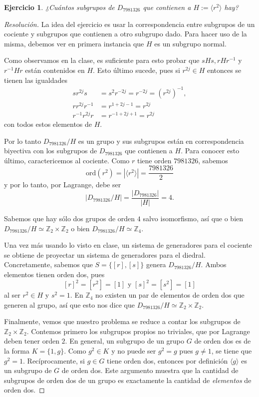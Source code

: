 \documentclass[11pt]{article}
\theoremstyle{colored}
\newtheorem{exercise}{Ejercicio}
\newcommand{\Z}{\mathbb{Z}}
\begin{document}
\begin{exercise} ¿Cuántos subgrupos de $D_{7981326}$ que contienen a $H := \langle r^2 \rangle$ hay?
\end{exercise}
\begin{proof}[Resolución] La idea del ejercicio es usar la correspondencia entre subgrupos de un cociente y subgrupos que contienen a otro subgrupo dado. Para hacer uso de la misma, debemos ver en primera instancia que $H$ es un subgrupo normal.

Como observamos en la clase, es suficiente para esto probar que $sHs,rHr^{-1}$ y $r^{-1}Hr$ están contenidos en $H$. Esto último sucede, pues si $r^{2j} \in H$ entonces se tienen las igualdades
\begin{align*}
sr^{2j}s &= s^2r^{-2j} = r^{-2j} = (r^{2j})^{-1},\\
rr^{2j}r^{-1}&=r^{1+2j-1} = r^{2j}\\
r^{-1}r^{2j}r&=r^{-1+2j+1} = r^{2j}
\end{align*}
con todos estos elementos de $H$. 

Por lo tanto $D_{7981326}/H$ es un grupo y sus subgrupos están en correspondencia biyectiva con los subgrupos de $D_{7981326}$ que contienen a $H$. Para conocer esto último, caractericemos al cociente. Como $r$ tiene orden $7981326$, sabemos
\[
\mathrm{ord}(r^2) = |\langle r^2 \rangle| = \frac{7981326}{2}
\]
y por lo tanto, por Lagrange, debe ser
\[
|D_{7981326}/H| = \frac{|D_{7981326}|}{|H|} = 4.
\]

Sabemos que hay sólo dos grupos de orden $4$ salvo isomorfismo, así que o bien $D_{7981326}/H \simeq \Z_2 \times \Z_2$ o bien $D_{7981326}/H \simeq \Z_4$. 

Una vez más usando lo visto en clase, un sistema de generadores para el cociente se obtiene de proyectar un sistema de generadores para el diedral. Concretamente, sabemos que $S = \{[r],[s]\}$ genera $D_{7981326}/H$. Ambos elementos tienen orden dos, pues 
\[
[r]^2 = [r^2] = [1] \text{ y } [s]^2 = [s^2] = [1]
\]
al ser $r^2 \in H$ y $s^2 = 1$. En $\Z_4$ no existen un par de elementos de orden dos que generen al grupo, así que esto nos dice que $D_{7981326}/H \simeq \Z_2 \times \Z_2$. 

Finalmente, vemos que nuestro problema se reduce a contar los subgrupos de $\Z_2 \times \Z_2$. Contemos primero los subgrupos propios no triviales, que por Lagrange deben tener orden $2$.
En general, un subgrupo de un grupo $G$ de orden dos es de la forma $K = \{1,g\}$. Como $g^2 \in K$ y no puede ser $g^2 = g$ pues $g\neq 1$, se tiene que $g^2 = 1$. Recíprocamente, si $g \in G$ tiene orden dos, entonces por definición $\langle g \rangle$ es un subgrupo de $G$ de orden dos. Este argumento muestra que la cantidad de subgrupos de orden dos de un grupo es exactamente la cantidad de \textit{elementos} de orden dos.


\end{proof}
\end{document}
